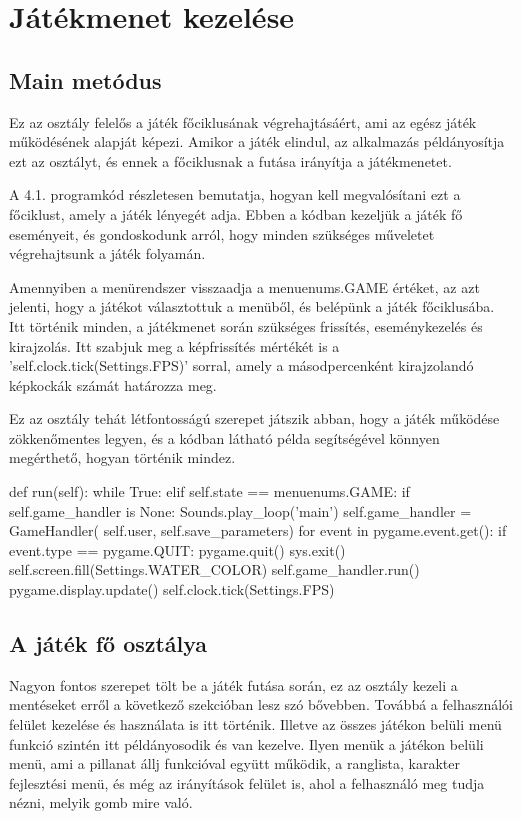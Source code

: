 \section{Játékmenet kezelése}

\subsection{Main metódus}
\indent \indent Ez az osztály felelős a játék főciklusának végrehajtásáért, ami az egész játék működésének alapját képezi. Amikor a játék elindul, az alkalmazás példányosítja ezt az osztályt, és ennek a főciklusnak a futása irányítja a játékmenetet.

A 4.1. programkód részletesen bemutatja, hogyan kell megvalósítani ezt a főciklust, amely a játék lényegét adja. Ebben a kódban kezeljük a játék fő eseményeit, és gondoskodunk arról, hogy minden szükséges műveletet végrehajtsunk a játék folyamán.

Amennyiben a menürendszer visszaadja a menuenums.GAME értéket, az azt jelenti, hogy a játékot választottuk a menüből, és belépünk a játék főciklusába. Itt történik minden, a játékmenet során szükséges frissítés, eseménykezelés és kirajzolás. Itt szabjuk meg a képfrissítés mértékét is a 'self.clock.tick(Settings.FPS)' sorral, amely a másodpercenként kirajzolandó képkockák számát határozza meg.

Ez az osztály tehát létfontosságú szerepet játszik abban, hogy a játék működése zökkenőmentes legyen, és a kódban látható példa segítségével könnyen megérthető, hogyan történik mindez.


\begin{python}[caption={Játék főciklusa},label=py:főciklus]
    def run(self):
        while True:
            elif self.state == menuenums.GAME:
                if self.game_handler is None:
                    Sounds.play_loop('main')
                    self.game_handler = GameHandler(
                        self.user, self.save_parameters)
                for event in pygame.event.get():
                    if event.type == pygame.QUIT:
                        pygame.quit()
                        sys.exit()
                self.screen.fill(Settings.WATER_COLOR)
                self.game_handler.run()
                pygame.display.update()
                self.clock.tick(Settings.FPS)
\end{python}\cite{main-loop}

\subsection{A játék fő osztálya}
\indent \indent Nagyon fontos szerepet tölt be a játék futása során, ez az osztály kezeli a mentéseket erről a következő szekcióban lesz szó bővebben. 
Továbbá a felhasználói felület kezelése és használata is itt történik. Illetve az összes játékon belüli menü funkció szintén itt példányosodik és van kezelve. Ilyen menük a játékon belüli menü, ami a pillanat állj funkcióval együtt működik, a ranglista, karakter fejlesztési menü, és még az irányítások felület is, ahol a felhasználó meg tudja nézni, melyik gomb mire való.

